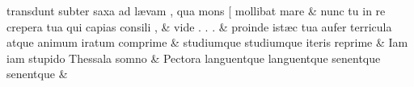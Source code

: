 \documentclass[12pt,onecolumn,twoside,a4paper]{memoir}
\begin{document}
\begin{pairs}
\begin{Leftside}
                              transdunt
                              subter
                              saxa
                              ad
                              lævam
                              ,
                              qua
                              mons
                              [
                              mollibat
                              mare \&
                         \stanza {}nunc
                              tu
                              in
                              re
                              crepera
                              tua
                              qui
                              capias
                              consili
                              , & 
                     vide
                              .
                              .
                              . \&
                         \stanza {}
                     proinde
                              istæc
                              tua
                              aufer
                              terricula
                              atque
                              animum
                              iratum
                              comprime \&
                         \stanza {}
                     studiumque
                              {studiumque}
                              iteris
                              reprime \&
                         \stanza {}Iam
                              iam
                              stupido
                              Thessala
                              somno & 
                     Pectora
                              languentque
                              {languentque}
                              senentque
                              {senentque} \&
                     
                  \endnumbering
		\end{Leftside}
                  \begin{Rightside}
			\beginnumbering
			\numberstanzafalse
                     

\end{Rightside}
\end{pairs}
\end{document}
